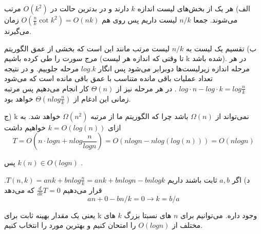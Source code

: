\par
الف)
هر یک از بخش‌های لیست اندازه 
$k$
دارند و در بدترین حالت در 
$O(k^2)$
مرتب می‌شوند.
جمعا 
$n/k$
لیست داریم پس روی هم 
$O(\frac{n}{k}\cot k^2) = O(nk)$
زمان می‌گیرند.

\par
%
ب)
تقسیم یک لیست به $n/k$ لیست مرتب مانند این است که بخشی از عمق الگوریتم مرج سورت را طی کرده باشیم (تا وقتی که اندازه هر لیست k شده باشد). در هر مرحله اندازه زیرلیست‌ها دوبرابر می‌شود پس انگار $log.k$ مرحله جلوییم.
و در نتیجه تعداد عملیات باقی مانده متناسب با عمق باقی مانده است که می‌شود 
$log \cdot n - log \cdot k = log \frac{n}{k}$
.
در هر مرحله نیز از 
$\Theta(n)$ 
کار انجام می‌دهیم پس مرتبه زمانی این ادغام از 
$\Theta(nlog\frac{n}{k})$
خواهد بود.

ج)
k 
نمی‌تواند از 
$\Omega(n)$ 
باشد چرا که 
الگوریتم ما از مرتبه 
$\Omega(n^2)$
خواهد شد.
به ازای 
$k= O(log(n))$
خواهیم داشت
$$T = O(n\cdot logn + n log \frac{n}{logn}) = O(nlogn - n log(log(n))) = O(nlogn)$$

پس $k(n) \in O(logn)$
.

د)
اگر
$a,b$
ثابت باشند
داریم 
$T(n,k) = ank + bnlog\frac{n}{k} = ank + bnlogn - bnlogk$.
قرار می‌دهیم 
$\frac{d}{dk} T = 0$
که می‌دهد 
$$ an + 0 - bn/k = 0 \rightarrow k = b/a $$

یعنی یک مقدار بهینه ثابت برای k وجود داره.
 می‌توانیم برای $n$ های نسبتا بزرگ $k$ های مختلف 
 از
 $O(logn)$
 را امتحان کنیم و بهترین مورد را انتخاب کنیم.